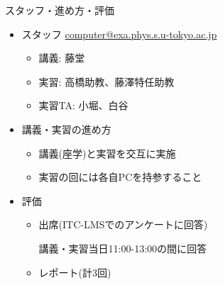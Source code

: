 \begin{frame}[t,fragile]{スタッフ・進め方・評価}
  \begin{itemize}
  \item スタッフ \href{mailto:computer@exa.phys.s.u-tokyo.ac.jp}{computer@exa.phys.s.u-tokyo.ac.jp}
    \begin{itemize}
    \item 講義: 藤堂
    \item 実習: 高橋助教、藤澤特任助教
    \item 実習TA: 小堀、白谷
    \end{itemize}
  \item 講義・実習の進め方
    \begin{itemize}
    \item 講義(座学)と実習を交互に実施
    \item 実習の回には各自PCを持参すること
    \end{itemize}
  \item 評価
    \begin{itemize}
    \item 出席(ITC-LMSでのアンケートに回答)

      講義・実習当日11:00-13:00の間に回答
      
    \item レポート(計3回)
    \end{itemize}    
  \end{itemize}    
\end{frame}

